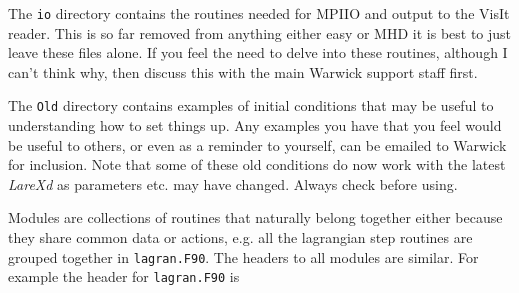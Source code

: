 \documentclass[11pt]{article}
\begin{document}
The \texttt{io} directory contains the routines needed for MPIIO and output to the VisIt reader. This is so far removed from anything either easy or MHD it is best to just leave these files alone. If you feel the need to delve into these routines, although I can't think why, then discuss this with the main Warwick support staff first.

The \texttt{Old} directory contains examples of initial conditions that may be useful to understanding how to set things up. Any examples you have that you feel would be useful to others, or even as a reminder to yourself, can be emailed to Warwick for inclusion. Note that some of these old conditions do now work with the latest {\it LareXd} as parameters etc. may have changed. Always check before using.

Modules are collections of routines that naturally belong together either because they share common data or actions, e.g. all the lagrangian step routines are grouped together in \texttt{lagran.F90}. The headers to all modules are similar. For example the header for \texttt{lagran.F90} is
\end{document}
